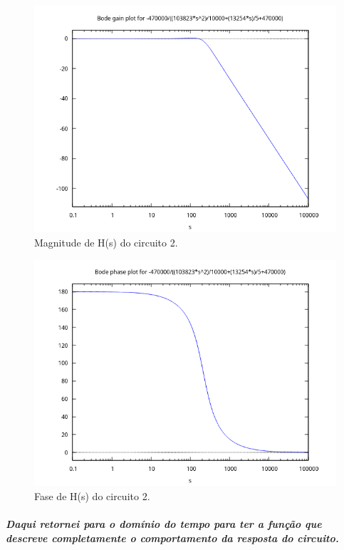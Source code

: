 \documentclass[12pt,twoside, a4paper, twocolumn]{article}
\begin{document}
\begin{figure}[h]
    \centering
    \includegraphics[width=1\columnwidth]{images/H2bodegain.png}
    \caption{Magnitude de H(s) do circuito 2.}
\end{figure}




\begin{figure}[h]
    \centering
    \includegraphics[width=1\columnwidth]{images/H2bodephase.png}
    \caption{Fase de H(s) do circuito 2.}
\end{figure}




\pagebreak




\subparagraph*{Daqui retornei para o domínio do tempo para ter a função que descreve completamente o comportamento  da resposta do circuito.}
\end{document}
